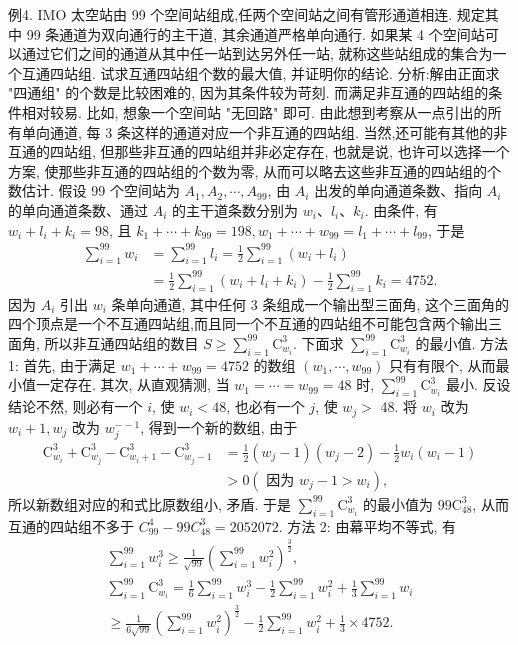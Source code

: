 例4. IMO 太空站由 99 个空间站组成,任两个空间站之间有管形通道相连.
规定其中 99 条通道为双向通行的主干道, 其余通道严格单向通行.
如果某 4 个空间站可以通过它们之间的通道从其中任一站到达另外任一站, 就称这些站组成的集合为一个互通四站组.
试求互通四站组个数的最大值, 并证明你的结论.
分析:解由正面求 "四通组" 的个数是比较困难的, 因为其条件较为苛刻.
而满足非互通的四站组的条件相对较易.
比如, 想象一个空间站 "无回路" 即可.
由此想到考察从一点引出的所有单向通道, 每 3 条这样的通道对应一个非互通的四站组.
当然,还可能有其他的非互通的四站组, 但那些非互通的四站组并非必定存在, 也就是说, 也许可以选择一个方案, 使那些非互通的四站组的个数为零, 从而可以略去这些非互通的四站组的个数估计.
假设 99 个空间站为 $A_1, A_2, \cdots, A_{99}$, 由 $A_i$ 出发的单向通道条数、指向 $A_i$ 的单向通道条数、通过 $A_i$ 的主干道条数分别为 $w_i 、 l_i 、 k_i$. 由条件, 有 $w_i+l_i+k_i=98$, 且 $k_1+\cdots+k_{99}=198, w_1+\cdots+w_{99}=l_1+\cdots+l_{99}$, 于是
$$
\begin{aligned}
\sum_{i=1}^{99} w_i & =\sum_{i=1}^{99} l_i=\frac{1}{2} \sum_{i=1}^{99}\left(w_i+l_i\right) \\
& =\frac{1}{2} \sum_{i=1}^{99}\left(w_i+l_i+k_i\right)-\frac{1}{2} \sum_{i=1}^{99} k_i=4752 .
\end{aligned}
$$
因为 $A_i$ 引出 $w_i$ 条单向通道, 其中任何 3 条组成一个输出型三面角, 这个三面角的四个顶点是一个不互通四站组,而且同一个不互通的四站组不可能包含两个输出三面角, 所以非互通四站组的数目 $S \geqslant \sum_{i=1}^{99} \mathrm{C}_{w_i}^3$.
下面求 $\sum_{i=1}^{99} \mathrm{C}_{w_i}^3$ 的最小值.
方法 1: 首先, 由于满足 $w_1+\cdots+w_{99}=4752$ 的数组 $\left(w_1, \cdots, w_{99}\right)$ 只有有限个, 从而最小值一定存在.
其次, 从直观猜测, 当 $w_1=\cdots=w_{99}=48$ 时, $\sum_{i=1}^{99} \mathrm{C}_{w_i}^3$ 最小.
反设结论不然, 则必有一个 $i$, 使 $w_i<48$, 也必有一个 $j$, 使 $w_j>$ 48. 将 $w_i$ 改为 $w_i+1, w_j$ 改为 $w_j^{--1}$, 得到一个新的数组, 由于
$$
\begin{aligned}
\mathrm{C}_{w_i}^3+\mathrm{C}_{w_j}^3-\mathrm{C}_{w_i+1}^3-\mathrm{C}_{w_j-1}^3 & =\frac{1}{2}\left(w_j-1\right)\left(w_j-2\right)-\frac{1}{2} w_i\left(w_i-1\right) \\
& >0\left(\text { 因为 } w_j-1>w_i\right),
\end{aligned}
$$
所以新数组对应的和式比原数组小, 矛盾.
于是 $\sum_{i=1}^{99} \mathrm{C}_{w_i}^3$ 的最小值为 $99 \mathrm{C}_{48}^3$, 从而互通的四站组不多于 $C_{99}^4-99 C_{48}^3=2052072$.
方法 2: 由幕平均不等式, 有
$$
\begin{gathered}
\sum_{i=1}^{99} w_i^3 \geqslant \frac{1}{\sqrt{99}}\left(\sum_{i=1}^{99} w_i^2\right)^{\frac{3}{2}}, \\
\sum_{i=1}^{99} \mathrm{C}_{w_i}^3=\frac{1}{6} \sum_{i=1}^{99} w_i^3-\frac{1}{2} \sum_{i=1}^{99} w_i^2+\frac{1}{3} \sum_{i=1}^{99} w_i \\
\geqslant \frac{1}{6 \sqrt{99}}\left(\sum_{i=1}^{99} w_i^2\right)^{\frac{3}{2}}-\frac{1}{2} \sum_{i=1}^{99} w_i^2+\frac{1}{3} \times 4752 .
\end{gathered}
$$
